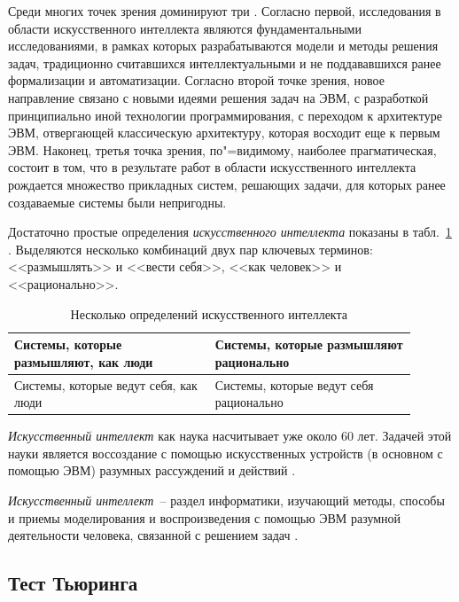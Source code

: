 \documentclass[a4paper,14pt, openany, twoside, final]{extbook} %
\begin{document}
Среди многих точек зрения доминируют три \cite{AIDictionary}. Согласно первой, исследования в области искусственного интеллекта являются фундаментальными исследованиями, в рамках которых разрабатываются модели и методы решения задач, традиционно считавшихся интеллектуальными и не поддававшихся ранее формализации и автоматизации. Согласно второй точке зрения, новое направление связано с новыми идеями решения задач на ЭВМ, с разработкой принципиально иной технологии программирования, с переходом к архитектуре ЭВМ, отвергающей классическую архитектуру, которая восходит еще к первым ЭВМ. Наконец, третья точка зрения, по"=видимому, наиболее прагматическая, состоит в том, что в результате работ в области искусственного интеллекта рождается множество прикладных систем, решающих задачи, для которых ранее создаваемые системы были непригодны.

Достаточно простые определения {\em искусственного интеллекта} показаны в табл.~\ref{pic:determai} \cite{Russell}. Выделяются несколько комбинаций двух пар ключевых терминов: <<размышлять>> и <<вести себя>>, <<как человек>> и <<рационально>>.

\begin{table}[tbh]
\begin{center}
\caption{Несколько определений искусственного интеллекта} \label{pic:determai}%
\begin{tabular}{|p{0.45\linewidth}|p{0.45\linewidth}|}
 \hline
   Системы, которые размышляют, как люди
 &
   Системы, которые размышляют рационально
 \\ \hline
   Системы, которые ведут себя, как люди
 &
   Системы, которые ведут себя рационально
 \\  \hline
\end{tabular}
\end{center}
\end{table}

{\em Искусственный интеллект} как наука насчитывает уже около 60 лет. Задачей этой науки является воссоздание с помощью искусственных устройств (в основном с помощью ЭВМ) разумных рассуждений и действий \cite{Lauriere}.\enlargethispage{1em}

{\em Искусственный интеллект}~-- раздел информатики, изучающий методы, способы и приемы моделирования и воспроизведения с помощью ЭВМ разумной деятельности человека, связанной с решением задач \cite{math_slov:88}.

\subsection{Тест Тьюринга}
\end{document}
